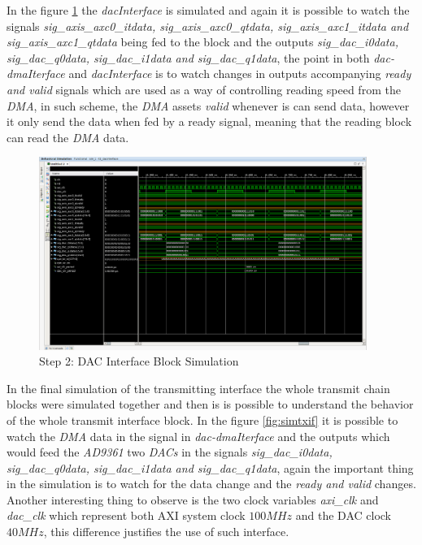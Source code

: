  In the figure \ref{fig:simdac} the \textit{dacInterface} is simulated and again
 it is possible to watch the signals \textit{sig\_axis\_axc0\_itdata,
 sig\_axis\_axc0\_qtdata, sig\_axis\_axc1\_itdata and sig\_axis\_axc1\_qtdata} being fed
 to the block and the outputs \textit{sig\_dac\_i0data, sig\_dac\_q0data,
 sig\_dac\_i1data and sig\_dac\_q1data}, the point in both \textit{dac-dmaIterface}
 and \textit{dacInterface} is to watch changes in outputs accompanying
 \textit{ready and valid} signals which are used as a way of controlling reading
 speed from the \textit{DMA}, in such scheme, the \textit{DMA} assets
 \textit{valid} whenever is can send data, however it only send the data when
 fed by a ready signal, meaning that the reading block can read the \textit{DMA}
 data.

\begin{figure}[htbp]
    \centering
    \includegraphics[width=0.95\textwidth]{./figures/dacInterface}
    \caption{ Step 2: DAC Interface Block Simulation
    \label{fig:simdac}}
\end{figure}

In the final simulation of the transmitting interface the whole transmit chain
blocks were simulated together and then is is possible to understand the
behavior of the whole transmit interface block. In the figure \ref{fig:simtxif}
it is possible to watch the \textit{DMA} data in the signal in
\textit{dac-dmaIterface} and the outputs which would feed the \textit{AD9361}
two \textit{DACs} in the signals \textit{sig\_dac\_i0data, sig\_dac\_q0data,
sig\_dac\_i1data and sig\_dac\_q1data}, again the important thing in the simulation
is to watch for the data change and the  \textit{ready and valid} changes.
Another interesting thing to observe is the two clock variables \textit{axi\_clk}
and \textit{dac\_clk} which represent both AXI system clock $ 100 MHz$ and the
DAC clock $40 MHz$, this difference justifies the use of such interface.


